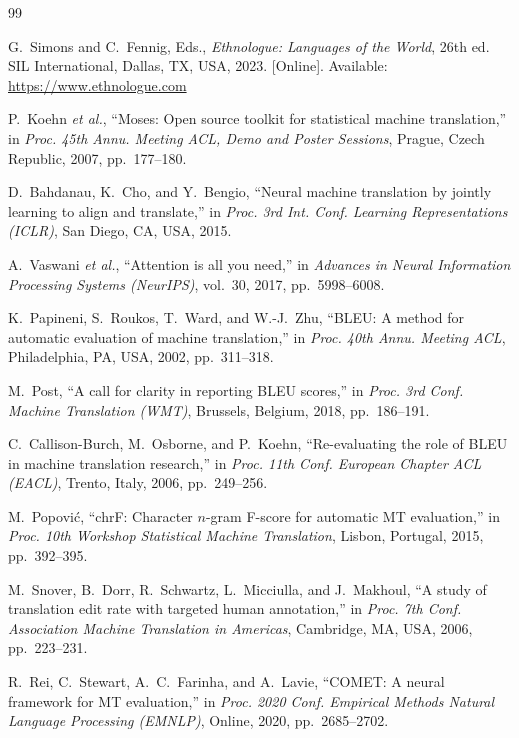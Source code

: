 \documentclass[conference]{IEEEtran}
\begin{document}
\begin{thebibliography}{99}

G.~Simons and C.~Fennig, Eds.,
\emph{Ethnologue: Languages of the World}, 26th ed.
SIL International, Dallas, TX, USA, 2023. [Online].
Available: \url{https://www.ethnologue.com}

P.~Koehn \textit{et al.},
``Moses: Open source toolkit for statistical machine translation,''
in \emph{Proc. 45th Annu. Meeting ACL, Demo and Poster Sessions},
Prague, Czech Republic, 2007, pp.~177--180.

D.~Bahdanau, K.~Cho, and Y.~Bengio,
``Neural machine translation by jointly learning to align and translate,''
in \emph{Proc. 3rd Int. Conf. Learning Representations (ICLR)},
San Diego, CA, USA, 2015.

A.~Vaswani \textit{et al.},
``Attention is all you need,''
in \emph{Advances in Neural Information Processing Systems (NeurIPS)},
vol.~30, 2017, pp.~5998--6008.

K.~Papineni, S.~Roukos, T.~Ward, and W.-J.~Zhu,
``BLEU: A method for automatic evaluation of machine translation,''
in \emph{Proc. 40th Annu. Meeting ACL},
Philadelphia, PA, USA, 2002, pp.~311--318.

M.~Post,
``A call for clarity in reporting BLEU scores,''
in \emph{Proc. 3rd Conf. Machine Translation (WMT)},
Brussels, Belgium, 2018, pp.~186--191.

C.~Callison-Burch, M.~Osborne, and P.~Koehn,
``Re-evaluating the role of BLEU in machine translation research,''
in \emph{Proc. 11th Conf. European Chapter ACL (EACL)},
Trento, Italy, 2006, pp.~249--256.

M.~Popovi\'{c},
``chrF: Character $n$-gram F-score for automatic MT evaluation,''
in \emph{Proc. 10th Workshop Statistical Machine Translation},
Lisbon, Portugal, 2015, pp.~392--395.

M.~Snover, B.~Dorr, R.~Schwartz, L.~Micciulla, and J.~Makhoul,
``A study of translation edit rate with targeted human annotation,''
in \emph{Proc. 7th Conf. Association Machine Translation in Americas},
Cambridge, MA, USA, 2006, pp.~223--231.

R.~Rei, C.~Stewart, A.~C.~Farinha, and A.~Lavie,
``COMET: A neural framework for MT evaluation,''
in \emph{Proc. 2020 Conf. Empirical Methods Natural Language Processing
(EMNLP)},
Online, 2020, pp.~2685--2702.


\end{thebibliography}
\end{document}
